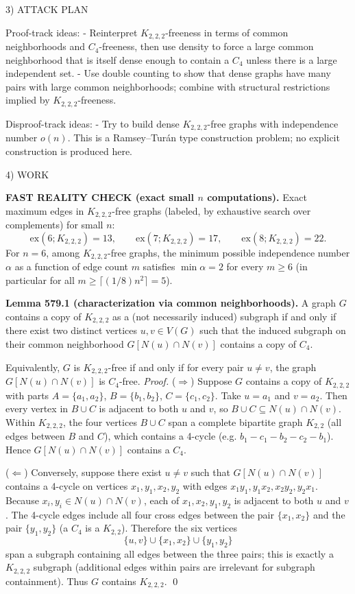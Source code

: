 3) ATTACK PLAN

Proof-track ideas:
- Reinterpret $K_{2,2,2}$-freeness in terms of common neighborhoods and $C_4$-freeness, then use density to force a large common neighborhood that is itself dense enough to contain a $C_4$ unless there is a large independent set.
- Use double counting to show that dense graphs have many pairs with large common neighborhoods; combine with structural restrictions implied by $K_{2,2,2}$-freeness.

Disproof-track ideas:
- Try to build dense $K_{2,2,2}$-free graphs with independence number $o(n)$. This is a Ramsey--Tur\'an type construction problem; no explicit construction is produced here.

4) WORK

\textbf{FAST REALITY CHECK (exact small $n$ computations).}
Exact maximum edges in $K_{2,2,2}$-free graphs (labeled, by exhaustive search over complements) for small $n$:
\[
\mathrm{ex}(6;K_{2,2,2})=13,\qquad \mathrm{ex}(7;K_{2,2,2})=17,\qquad \mathrm{ex}(8;K_{2,2,2})=22.
\]
For $n=6$, among $K_{2,2,2}$-free graphs, the minimum possible independence number $\alpha$ as a function of edge count $m$ satisfies $\min\alpha=2$ for every $m\ge 6$ (in particular for all $m\ge \lceil (1/8)n^2\rceil=5$).

\medskip
\textbf{Lemma 579.1 (characterization via common neighborhoods).}
A graph $G$ contains a copy of $K_{2,2,2}$ as a (not necessarily induced) subgraph if and only if there exist two distinct vertices $u,v\in V(G)$ such that the induced subgraph on their common neighborhood $G[N(u)\cap N(v)]$ contains a copy of $C_4$.

Equivalently, $G$ is $K_{2,2,2}$-free if and only if for every pair $u\ne v$, the graph $G[N(u)\cap N(v)]$ is $C_4$-free.
\emph{Proof.}
($\Rightarrow$) Suppose $G$ contains a copy of $K_{2,2,2}$ with parts
$A=\{a_1,a_2\}$, $B=\{b_1,b_2\}$, $C=\{c_1,c_2\}$.
Take $u=a_1$ and $v=a_2$.
Then every vertex in $B\cup C$ is adjacent to both $u$ and $v$, so $B\cup C\subseteq N(u)\cap N(v)$.
Within $K_{2,2,2}$, the four vertices $B\cup C$ span a complete bipartite graph $K_{2,2}$ (all edges between $B$ and $C$), which contains a 4-cycle (e.g. $b_1-c_1-b_2-c_2-b_1$).
Hence $G[N(u)\cap N(v)]$ contains a $C_4$.

($\Leftarrow$) Conversely, suppose there exist $u\ne v$ such that $G[N(u)\cap N(v)]$ contains a 4-cycle on vertices $x_1,y_1,x_2,y_2$ with edges $x_1y_1,y_1x_2,x_2y_2,y_2x_1$.
Because $x_i,y_i\in N(u)\cap N(v)$, each of $x_1,x_2,y_1,y_2$ is adjacent to both $u$ and $v$.
The 4-cycle edges include all four cross edges between the pair $\{x_1,x_2\}$ and the pair $\{y_1,y_2\}$ (a $C_4$ is a $K_{2,2}$).
Therefore the six vertices
\[
\{u,v\}\cup\{x_1,x_2\}\cup\{y_1,y_2\}
\]
span a subgraph containing all edges between the three pairs; this is exactly a $K_{2,2,2}$ subgraph (additional edges within pairs are irrelevant for subgraph containment).
Thus $G$ contains $K_{2,2,2}$.
\qed

